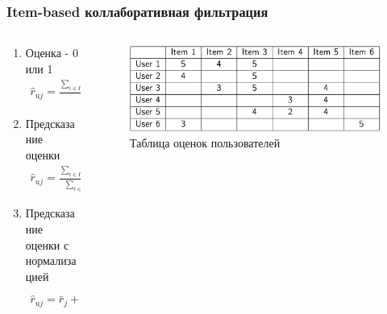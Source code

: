 \documentclass[10pt, unicode]{beamer}
\begin{document}
\begin{frame}
  \frametitle{Item-based коллаборативная фильтрация}
  \begin{columns}[T]
    \begin{column}{.6\textwidth}
     		\begin{enumerate}
          \item Оценка - 0 или 1
          \begin{align*}
            \hat{r}_{uj} = \frac{\sum_{i \in I_u} SIM(i,j)}{|I_u|}
          \end{align*}
          \item Предсказание оценки
          \begin{align*}
            \hat{r}_{uj} = \frac{\sum_{i \in I_u} SIM(i,j) r_{ui} }{\sum_{i \in I_u} SIM(i,j)}
          \end{align*}
          \item Предсказание оценки с нормализацией
          \begin{align*}
            \hat{r}_{uj} = \bar{r}_j + \frac{\sum_{i \in I_u} SIM(i,j) (r_{ui} - \bar{r}_i) }{\sum_{i \in I_u} SIM(i,j)}
          \end{align*}
        \end{enumerate}
    	\end{column}
    	\begin{column}{.4\textwidth}
    		\begin{figure}
    			\includegraphics[width=\textwidth]{images/user_item.png}
    			\caption{Таблица оценок пользователей}
    		\end{figure}
      \end{column}
  \end{columns}
\end{frame}
\end{document}
